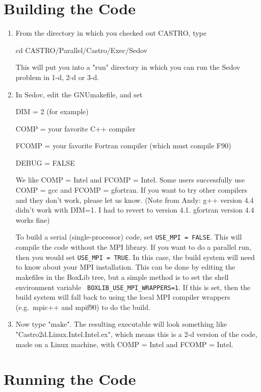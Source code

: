 \clearpage

\section{Building the Code}

\begin{enumerate}

\item From the directory in which you checked out CASTRO, type

cd CASTRO/Parallel/Castro/Exec/Sedov

This will put you into a "run" directory in which you can run the Sedov problem in 1-d, 2-d or 3-d.
\item In Sedov, edit the GNUmakefile, and set

DIM = 2 (for example)

COMP = your favorite C++ compiler

FCOMP = your favorite Fortran compiler (which must compile F90)

DEBUG = FALSE

We like COMP = Intel and FCOMP = Intel. Some users successfully use 
COMP = gcc and FCOMP = gfortran. If you want to try other compilers and they don't work, 
please let us know.  (Note from Andy: g++ version 4.4 didn't work with DIM=1.  I had to revert to version 4.1.  gfortran version 4.4 works fine)

To build a serial (single-processor) code, set {\tt USE\_MPI = FALSE}.
This will compile the code without the MPI library.  If you want to do
a parallel run, then you would set {\tt USE\_MPI = TRUE}.  In this
case, the build system will need to know about your MPI installation.
This can be done by editing the makefiles in the BoxLib tree, but a
simple method is to set the shell environment variable {\tt
  BOXLIB\_USE\_MPI\_WRAPPERS=1}.  If this is set, then the build
system will fall back to using the local MPI compiler wrappers
(e.g.\ mpic++ and mpif90) to do the build.

\item Now type "make". The resulting executable will look something like 
"Castro2d.Linux.Intel.Intel.ex", which means this is a 2-d version of the code, 
made on a Linux machine, with COMP = Intel and FCOMP = Intel.

\end{enumerate}

\section{Running the Code}

